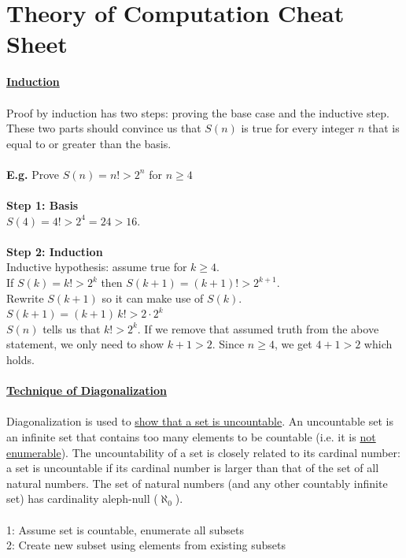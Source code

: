 \documentclass[8pt,letterpaper,twocolumn]{article}
\begin{document}
\section*{Theory of Computation Cheat Sheet}
\underline{\textbf{Induction}}\\ %
\\
Proof by induction has two steps: proving the base case and the inductive step.
These two parts should convince us that $S(n)$ is true for every integer $n$
that is equal to or greater than the basis.\\
\\
\textbf{E.g.} Prove $S(n) = n! > 2^n$ for $n \geq 4$\\
\\
\textbf{Step 1: Basis}\\ %
$S(4) = 4! > 2^4 = 24 > 16$.\\
\\
\textbf{Step 2: Induction}\\
Inductive hypothesis: assume true for $k \geq 4$.\\
If $S(k) = k! > 2^k$ then $S(k+1) = (k+1)! > 2^{k+1}$.\\
Rewrite $S(k+1)$ so it can make use of $S(k)$.\\
$S(k+1) = (k+1)\,k! > 2 \cdot 2^k$\\
$S(n)$ tells us that $k! > 2^k$.
If we remove that assumed truth from the above statement, we only need to show $k+1 > 2$.
Since $n \geq 4$, we get $4 + 1 > 2$ which holds.\\
\\
\underline{\textbf{Technique of Diagonalization}}\\
\\
Diagonalization is used to \underline{show that a set is uncountable}.
An uncountable set is an infinite set that contains too many elements to be countable
(i.e. it is \underline{not enumerable}).
The uncountability of a set is closely related to its cardinal number:
a set is uncountable if its cardinal number is larger than that of the set of all natural numbers.
The set of natural numbers (and any other countably infinite set) has cardinality aleph-null
($\aleph_0$).\\
\\
1: Assume set is countable, enumerate all subsets\\
2: Create new subset using elements from existing subsets\\
\end{document}
